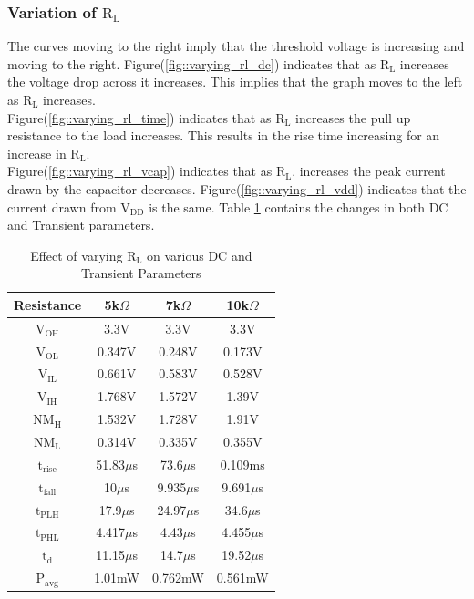 \documentclass[12pt, a4paper]{article}
\begin{document}
	\subsubsection{Variation of $\text{R}_\text{L}$}
	The curves moving to the right imply that the threshold voltage is increasing and moving to the right. Figure(\ref{fig::varying_rl_dc}) indicates that as $\text{R}_\text{L}$ increases the voltage drop across it increases. This implies that the graph moves to the left as $\text{R}_\text{L}$ increases.\\
	Figure(\ref{fig::varying_rl_time}) indicates that as $\text{R}_\text{L}$ increases the pull up resistance to the load increases. This results in the rise time increasing for an increase in $\text{R}_\text{L}$.\\
	Figure(\ref{fig::varying_rl_vcap}) indicates that as $\text{R}_\text{L}$. increases the peak current drawn by the capacitor decreases. Figure(\ref{fig::varying_rl_vdd}) indicates that the current drawn from $\text{V}_{\text{DD}}$ is the same. Table \ref{table::tablevaryrl} contains the changes in both DC and Transient parameters.
	\begin{table}[H]
		\begin{center}
			\begin{tabular}{|c|c|c|c|}
				\hline 
				\rule[-1ex]{0pt}{2.5ex} Resistance & 5k$\Omega$ & 7k$\Omega$ & 10k$\Omega$  \\ 
				\hline 
				\rule[-1ex]{0pt}{2.5ex} $\text{V}_\text{OH}$ & 3.3V & 3.3V & 3.3V \\ 
				$\text{V}_\text{OL}$ & 0.347V & 0.248V & 0.173V \\ 
				$\text{V}_\text{IL}$ & 0.661V & 0.583V & 0.528V \\ 
				$\text{V}_\text{IH}$ & 1.768V & 1.572V & 1.39V \\ 
				$\text{NM}_\text{H}$ & 1.532V & 1.728V & 1.91V \\ 
				$\text{NM}_\text{L}$ & 0.314V & 0.335V & 0.355V \\ 
				$\text{t}_\text{rise}$ & 51.83$\mu$s & 73.6$\mu$s & 0.109ms \\ 
				$\text{t}_\text{fall}$ & 10$\mu$s & 9.935$\mu$s & 9.691$\mu$s \\ 
				$\text{t}_\text{PLH}$ & 17.9$\mu$s & 24.97$\mu$s & 34.6$\mu$s \\ 
				$\text{t}_\text{PHL}$ & 4.417$\mu$s & 4.43$\mu$s & 4.455$\mu$s \\ 
				$\text{t}_\text{d}$ & 11.15$\mu$s & 14.7$\mu$s & 19.52$\mu$s \\ 
				$\text{P}_\text{avg}$ & 1.01mW  & 0.762mW & 0.561mW \\ 
				\hline 
			\end{tabular} 
		\end{center}
		\caption{Effect of varying $\text{R}_\text{L}$ on various DC and Transient Parameters}
		\label{table::tablevaryrl}
	\end{table}
\end{document}
